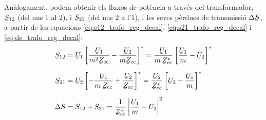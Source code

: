 An\`{a}logament, podem obtenir els fluxos de pot\`{e}ncia a trav\'{e}s del
transformador, $\cmplx{S}_{12}$ (del nus 1 al 2), i $\cmplx{S}_{21}$
(del nus 2 a l'1), i les seves p\`{e}rdues de transmissi\'{o}
$\Delta\cmplx{S}$, a partir de les equacions
\eqref{eq:s12_trafo_reg_decal},  \eqref{eq:s21_trafo_reg_decal} i
\eqref{eq:ds_trafo_reg_decal}:  
\begin{align}
   \cmplx{S}_{12} &= \cmplx{U}_1 \left[ \frac{\cmplx{U}_1}{m^2 \cmplx{Z}\ped{cc}} - \frac{\cmplx{U}_2}{m \cmplx{Z}\ped{cc}} \right]^* = \frac{\cmplx{U}_1}{m \,\cmplx{Z}\ped{cc}^*} \left[ \frac{\cmplx{U}_1}{m} - \cmplx{U}_2 \right]^*  \\[1.5ex]
   \cmplx{S}_{21} &= \cmplx{U}_2 \left[ - \frac{\cmplx{U}_1}{m \,\cmplx{Z}\ped{cc}} + \frac{\cmplx{U}_2} {\cmplx{Z}\ped{cc}} \right]^* = \frac{\cmplx{U}_2}{\cmplx{Z}\ped{cc}^*} \left[  \cmplx{U}_2 - \frac{\cmplx{U}_1}{m}  \right]^* \\[1.5ex]
 \Delta\cmplx{S} &= \cmplx{S}_{12} + \cmplx{S}_{21} = \frac{1}{\cmplx{Z}\ped{cc}^*}  \left|
    \frac{\cmplx{U}_1}{m} - \cmplx{U}_2 \right|^2
\end{align}


